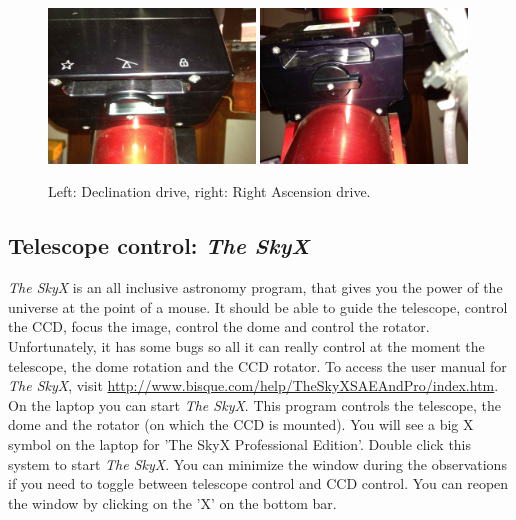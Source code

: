 \documentclass[12pt,twoside,a4paper]{report}
\begin{document}
\begin{figure}[ht]
 \centering
    \includegraphics[width=0.49\textwidth]{documentation_images/decdrive}
    \includegraphics[width=0.49\textwidth]{documentation_images/radrive}
    \caption{\label{fig:drives} Left: Declination drive, right: Right Ascension drive.}
\end{figure}

\subsection{Telescope control: \emph{The SkyX}}

\emph{The SkyX} is an all inclusive astronomy program, that gives you the power of the 
universe at the point of a mouse. It should be able to guide the telescope, control the CCD, 
focus the image, control the dome and control the rotator. 
Unfortunately, it has some bugs so all it can really control at the moment the telescope, the 
dome rotation and the CCD rotator. To access the user manual for \emph{The SkyX}, 
visit \url{http://www.bisque.com/help/TheSkyXSAEAndPro/index.htm}.\\

On the laptop you can start \emph{The SkyX}. This program controls the telescope, the dome and the
rotator (on which the CCD is mounted).
You will see a big X symbol on the laptop for 'The SkyX Professional Edition'. Double click this
system to start \emph{The SkyX}. You can minimize the window during the observations if you need to 
toggle between telescope control and CCD control. You can reopen the window by clicking on the 'X' 
on the bottom bar.\\
\end{document}
